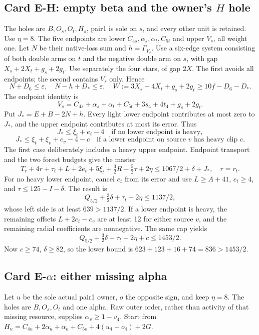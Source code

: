 \documentclass[11pt,letterpaper]{article}
\theoremstyle{definition}\newtheorem{definition}[theorem]{Definition}
\begin{document}
\subsection{Card E-H: empty beta and the owner's $H$ hole}\label{sec:z4-cardEH}
The holes are $B,O_s,O_t,H_s$, pair1 is sole on $s$, and every other unit is retained. Use $\eta=8$. The five endpoints are lower $C_{4s},\alpha_s,\alpha_t,C_{5t}$ and upper $V_s$, all weight one. Let $N$ be their native-loss sum and $h=\Gamma_{V_s}$.
Use a six-edge system consisting of both double arms on $t$ and the negative double arm on $s$, with gap $X_s+2X_t+g_s+2g_t$. Use separately the four stars, of gap $2X$. The first avoids all endpoints; the second contains $V_s$ only. Hence
\[
 N+D_6\le\varepsilon,\quad N-h+D_*\le\varepsilon,
 \quad W:=3X_s+4X_t+g_s+2g_t\ge10f-D_6-D_*.
\]
The endpoint identity is
\[
 V_s=C_{4s}+\alpha_s+\alpha_t+C_{5t}+3s_4+4t_4+g_s+2g_t.
\]
Put $J_*=E+B-2N+h$. Every light lower endpoint contributes at most zero to $J_*$, and the upper endpoint contributes at most its error. Thus
\[
 J_*\le\xi_t+e_t-4\quad\text{if no lower endpoint is heavy},
\]
\[
 J_*\le\xi_t+\xi_v+e_v-4-c\quad\text{if a lower endpoint on source }v
 \text{ has heavy clip }c.
\]
The first case deliberately includes a heavy upper endpoint. Endpoint transport and the two forest budgets give the master
\[
 T_r+4r+\tau_t+L+2e_t+5\xi_t+\tfrac32R-\tfrac52\tau+2\eta
 \le1067/2+\delta+J_*,\quad r=r_t.
\]
For no heavy lower endpoint, cancel $e_t$ from its error and use $L\ge A+41$, $e_t\ge4$, and $\tau\le125-I-\delta$. The result is
\[
 Q_{5/2}+\tfrac32\delta+\tau_t+2\eta\le1137/2,
\]
whose left side is at least $639>1137/2$. If a lower endpoint is heavy, the remaining offsets $L+2e_t-e_v$ are at least 12 for either source $v$, and the remaining radial coefficients are nonnegative. The same cap yields
\[
 Q_{5/2}+\tfrac32\delta+\tau_t+2\eta+c\le1453/2.
\]
Now $c\ge74$, $\delta\ge82$, so the lower bound is $623+123+16+74=836>1453/2$.

\subsection{Card E-$\alpha$: either missing alpha}\label{sec:z4-cardEA}
Let $u$ be the sole actual pair1 owner, $o$ the opposite sign, and keep $\eta=8$. The holes are $B,O_s,O_t$ and one alpha. Raw outer order, rather than activity of that missing resource, supplies $\alpha_v\ge1-v_4$. Start from
$H_u=C_{4u}+2\alpha_u+\alpha_o+C_{5o}+4(u_4+o_4)+2G$.
\end{document}
